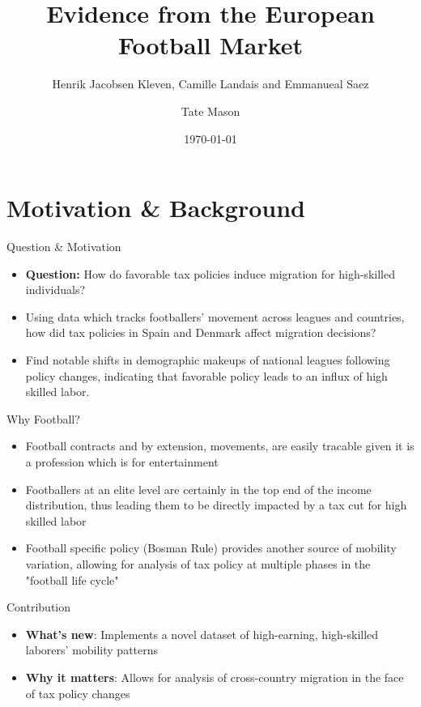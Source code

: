 \documentclass[aspectratio=169,professionalfonts]{beamer}
\title[Taxation and International Migration of Superstars]{Evidence from the European Football Market}
\subtitle{Henrik Jacobsen Kleven, Camille Landais and Emmanueal Saez}
\author[Tate Mason]{Tate Mason}
\institute[UGA]{John Munro Godfrey Sr. Dept. of Economics \\ University of Georgia}
\date{\today}
\newcommand{\hl}[1]{\textbf{\textcolor{UGARed}{#1}}}
\newcommand{\hl}[1]{\textbf{\color{UGARed}{#1}}}
\begin{document}
\begin{frame}
  \titlepage
\end{frame}
\section{Motivation \& Background}

\begin{frame}{Question \& Motivation}
  \begin{itemize}
    \item \hl{Question:} How do favorable tax policies induce migration for high-skilled individuals?
    \item Using data which tracks footballers' movement across leagues and countries, how did tax policies in Spain and Denmark affect migration decisions?
    \item Find notable shifts in demographic makeups of national leagues following policy changes, indicating that favorable policy leads to an influx of high skilled labor.
  \end{itemize}
\end{frame}

\begin{frame}{Why Football?}
  \begin{itemize}
    \item Football contracts and by extension, movements, are easily tracable given it is a profession which is for entertainment
    \item Footballers at an elite level are certainly in the top end of the income distribution, thus leading them to be directly impacted by a tax cut for high skilled labor
    \item Football specific policy (Bosman Rule) provides another source of mobility variation, allowing for analysis of tax policy at multiple phases in the "football life cycle"
  \end{itemize}
\end{frame}

\begin{frame}{Contribution}
  \begin{itemize}
    \item \hl{What’s new}: Implements a novel dataset of high-earning, high-skilled laborers' mobility patterns
    \item \hl{Why it matters}: Allows for analysis of cross-country migration in the face of tax policy changes
  \end{itemize}
\end{frame}
\end{document}
